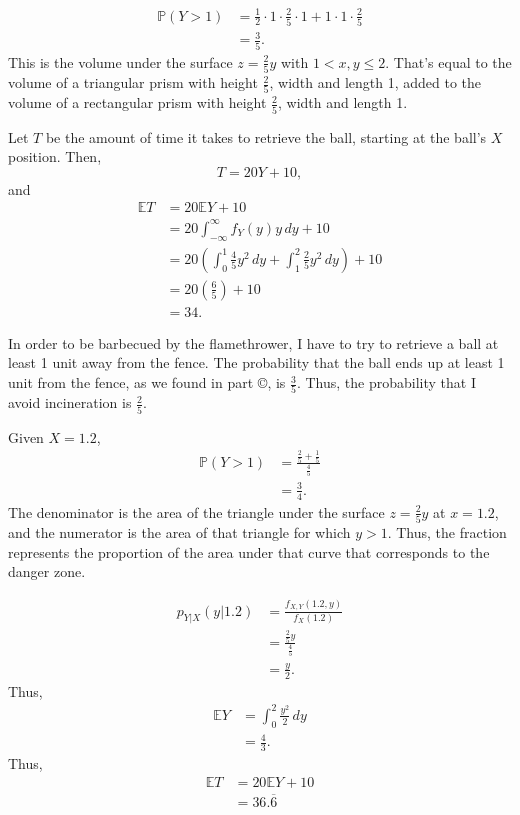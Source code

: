 \documentclass[12pt]{article}
\begin{document}
\newpage
{}
\begin{align*}
    \mathbb P(Y > 1) &= \frac12 \cdot 1 \cdot \frac25 \cdot 1 + 1 \cdot 1 \cdot \frac25 \\
                     &= \frac35.
\end{align*} This is the volume under the surface $z=\frac25y$ with $1 < x,y \leq 2$. That's equal to the volume of a triangular prism with height $\frac25$, width and length 1, added to the volume of a rectangular prism with height $\frac25$, width and length 1.

\medskip
{}

    Let $T$ be the amount of time it takes to retrieve the ball, starting at the ball's $X$ position. Then, $$T = 20Y + 10,$$ and
    \begin{align*}
        \mathbb ET &= 20\mathbb EY + 10 \\
                   &= 20\int_{-\infty}^\infty f_Y(y)y\,dy + 10 \\
                   &= 20\left(\int_0^1 \frac45y^2 \,dy + \int_1^2 \frac25y^2 \,dy\right) + 10 \\
                   &= 20\left(\frac65\right) + 10 \\
                   &= 34.
    \end{align*}

\medskip
{}

    In order to be barbecued by the flamethrower, I have to try to retrieve a ball at least 1 unit away from the fence. The probability that the ball ends up at least 1 unit from the fence, as we found in part \copyright, is $\frac35$. Thus, the probability that I avoid incineration is $\frac25$.

\newpage
{} Given $X=1.2$,
\begin{align*}
    \mathbb P(Y > 1) &= \frac{\frac25 + \frac15}{\frac45} \\
                     &= \frac34.
\end{align*} The denominator is the area of the triangle under the surface $z=\frac25y$ at $x=1.2$, and the numerator is the area of that triangle for which $y > 1$. Thus, the fraction represents the proportion of the area under that curve that corresponds to the danger zone.

\begin{align*}
    p_{Y|X}(y|1.2) &= \frac{f_{X,Y}(1.2, y)}{f_X(1.2)} \\
                   &= \frac{\frac25y}{\frac45} \\
                   &= \frac y2.
\end{align*}
Thus, 
\begin{align*}
    \mathbb EY &= \int_0^2\frac{y^2}2\,dy \\
               &= \frac43.
\end{align*}
Thus,
\begin{align*}
    \mathbb ET &= 20 \mathbb EY + 10 \\
               &= 36.\overline{6}
\end{align*}
\end{document}

